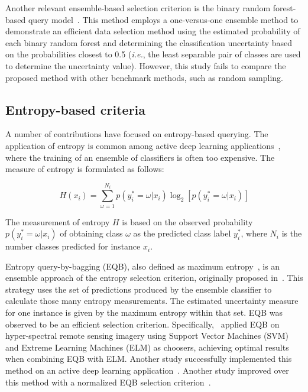\documentclass[preprint,12pt]{elsarticle}
\begin{document}
Another relevant ensemble-based selection criterion is the binary random
forest-based query model~\cite{Su2020}. This method employs a one-versus-one
ensemble method to demonstrate an efficient data selection method using the
estimated probability of each binary random forest and determining the
classification uncertainty based on the probabilities closest to 0.5
(\textit{i.e.}, the least separable pair of classes are used to determine the
uncertainty value). However, this study fails to compare the proposed method
with other benchmark methods, such as random sampling.

\subsection{Entropy-based criteria}

A number of contributions have focused on entropy-based querying. The
application of entropy is common among active deep learning
applications~\cite{Aghdam2019}, where the training of an ensemble of
classifiers is often too expensive. The measure of entropy is formulated as
follows:

\begin{equation}\label{eq:entropy}
    H(x_i) = \sum_{\omega=1}^{N_i}{p(y_{i}^{*}=\omega|x_i)}\log_2[p(y_{i}^{*}=\omega|x_i)]
\end{equation}

The measurement of entropy $H$ is based on the observed probability
$p(y_{i}^{*}=\omega|x_i)$ of obtaining class $\omega$ as the predicted class
label $y_{i}^{*}$, where $N_i$ is the number classes predicted for instance  
$x_i$.

Entropy query-by-bagging (EQB), also defined as maximum
entropy~\cite{Liu2020}, is an ensemble approach of the entropy selection
criterion, originally proposed in~\cite{Tuia2009}. This strategy uses the set
of predictions produced by the ensemble classifier to calculate those many
entropy measurements. The estimated uncertainty measure for one instance is
given by the maximum entropy within that set. EQB was observed to be an
efficient selection criterion. Specifically,~\cite{Shrivastava2021} applied
EQB on hyper-spectral remote sensing imagery using Support Vector Machines
(SVM) and Extreme Learning Machines (ELM) as choosers, achieving optimal
results when combining EQB with ELM\@. Another study successfully implemented
this method on an active deep learning application~\cite{Liu2020}. Another
study improved over this method with a normalized EQB selection
criterion~\cite{Copa2010}.
\end{document}
